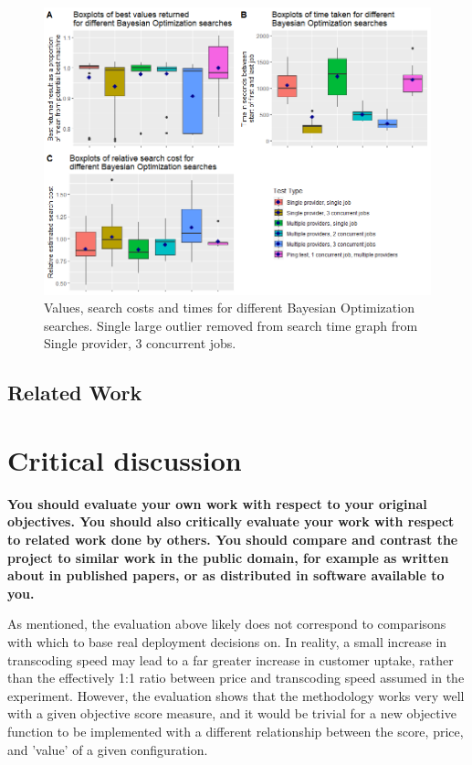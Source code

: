 \documentclass{article}
\begin{document}
\begin{figure}
  \caption{Values, search costs and times for different Bayesian Optimization searches. Single large outlier removed from search time graph from Single provider, 3 concurrent jobs.}
  \label{fig:bo-boxplots}
  \centering
  \includegraphics[scale=0.5]{bo_boxplots}
\end{figure}


\subsection{Related Work}


\section{Critical discussion}
\textbf{You should evaluate your own work with respect to your
original objectives. You should also critically evaluate
your work with respect to related work done by others.
You should compare and contrast the project to similar
work in the public domain, for example as written about
in published papers, or as distributed in software available to you. }

As mentioned, the evaluation above likely does not correspond to comparisons with which to base real deployment decisions on. In reality, a small increase in transcoding speed may lead to a far greater increase in customer uptake, rather than the effectively 1:1 ratio between price and transcoding speed assumed in the experiment. However, the evaluation shows that the methodology works very well with a given objective score measure, and it would be trivial for a new objective function to be implemented with a different relationship between the score, price, and 'value' of a given configuration.
\end{document}
